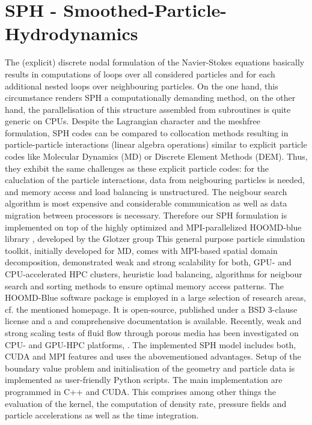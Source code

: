 \section{SPH - Smoothed-Particle-Hydrodynamics}
The (explicit) discrete nodal formulation of the Navier-Stokes equations basically results in computations of loops over all considered particles and for each additional nested loops over neighbouring particles. On the one hand, this circumstance renders SPH a computationally demanding method, on the other hand, the parallelisation of this structure assembled from subroutines is quite generic on CPUs. 
Despite the Lagrangian character and the meshfree formulation, SPH codes can be compared to collocation methods resulting
in particle-particle interactions (linear algebra operations)
similar to explicit particle codes like Molecular Dynamics (MD)
or Discrete Element Methods (DEM).
Thus, they exhibit the same challenges as these explicit particle codes: for the caluclation of the particle interactions, data from neigbouring particles is needed, and memory access and load balancing is unstructured. The neigbour search algorithm is most expensive and considerable communication as well as data migration between processors is necessary.
Therefore our SPH formulation is implemented on top of the highly optimized and MPI-parallelized HOOMD-blue library \cite{anderson2008general, glaser2015strong}, developed by the Glotzer group 
  This general purpose particle simulation toolkit, initially developed for MD, comes with MPI-based spatial domain decomposition, demonstrated weak and strong scalability for both, GPU- and CPU-accelerated HPC clusters, heuristic load balancing, algorithms for neigbour search and sorting methods to ensure optimal memory access patterns. 
The HOOMD-Blue software package is employed in a large selection of research areas, cf. the mentioned homepage. It is open-source, published under a BSD 3-clause license and a and comprehensive documentation is available.
Recently, weak and strong scaling tests of fluid flow through porous media
has been investigated on CPU- and GPU-HPC platforms, 
\cite{osorno2019}.
The implemented SPH model \cite{sivanesapillai2016pore} includes both, CUDA and MPI features and uses the abovementioned advantages. Setup of the boundary value problem and initialisation of the geometry and particle data is implemented as user-friendly Python scripts. The main implementation are programmed in C++ and CUDA. This comprises among other things the evaluation of the kernel, the computation of density rate, pressure fields and particle accelerations as well as the time integration. 
